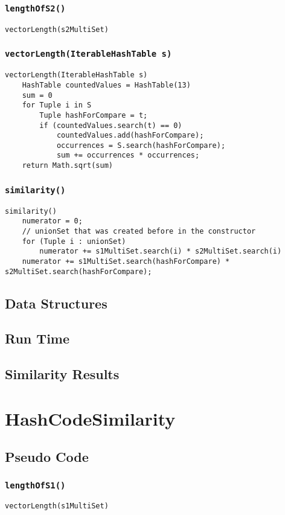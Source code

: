 \documentclass[10pt,letterpaper]{article}
\begin{document}
\subsubsection{\texttt{lengthOfS2()}}
\begin{verbatim}
vectorLength(s2MultiSet)
\end{verbatim}
\subsubsection{\texttt{vectorLength(IterableHashTable s)}}
\begin{verbatim}
vectorLength(IterableHashTable s)
    HashTable countedValues = HashTable(13)
    sum = 0
    for Tuple i in S
        Tuple hashForCompare = t;
        if (countedValues.search(t) == 0)
            countedValues.add(hashForCompare);
            occurrences = S.search(hashForCompare);
            sum += occurrences * occurrences;
    return Math.sqrt(sum)
\end{verbatim}
\subsubsection{\texttt{similarity()}}
\begin{verbatim}
similarity()
    numerator = 0;
    // unionSet that was created before in the constructor
    for (Tuple i : unionSet)
        numerator += s1MultiSet.search(i) * s2MultiSet.search(i)
    numerator += s1MultiSet.search(hashForCompare) * s2MultiSet.search(hashForCompare);
\end{verbatim}
\subsection{Data Structures}
\subsection{Run Time}
\subsection{Similarity Results}
\section{HashCodeSimilarity}
\subsection{Pseudo Code}
\subsubsection{\texttt{lengthOfS1()}}
\begin{verbatim}
vectorLength(s1MultiSet)
\end{verbatim}
\end{document}
